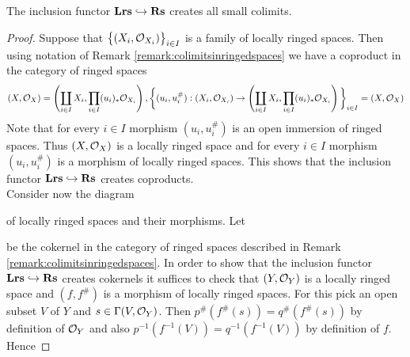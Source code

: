 \begin{theorem}\label{theorem:colimitscreationforLrstoRs}
The inclusion functor $\mathbf{Lrs}\hookrightarrow \mathbf{Rs}$ creates all small colimits.
\end{theorem}
\begin{proof}
Suppose that $\big\{(X_i,{\mathcal O}_{X_i})\big\}_{i\in I}$ is a family of locally ringed spaces. Then using notation of Remark \ref{remark:colimitsinringedspaces} we have a coproduct in the category of ringed spaces
$$(X,{\mathcal O}_X) = \left(\coprod_{i\in I}X_i,\prod_{i\in I}(u_i)_*{\mathcal O}_{X_i}\right),\bigg\{(u_i,u_i^{\#}):(X_i,{\mathcal O}_{X_i})\rightarrow \left(\coprod_{i\in I}X_i,\prod_{i\in I}(u_i)_*{\mathcal O}_{X_i}\right)\bigg\}_{i\in I} = (X,{\mathcal O}_X)$$
Note that for every $i\in I$ morphism $(u_i,u_i^{\#})$ is an open immersion of ringed spaces. Thus $(X,{\mathcal O}_X)$ is a locally ringed space and for every $i\in I$ morphism $(u_i,u_i^{\#})$ is a morphism of locally ringed spaces. This shows that the inclusion functor $\mathbf{Lrs}\hookrightarrow \mathbf{Rs}$ creates coproducts.\\
Consider now the diagram
\begin{center}
\end{center}
of locally ringed spaces and their morphisms. Let
\begin{center}
\end{center}
be the cokernel in the category of ringed spaces described in Remark \ref{remark:colimitsinringedspaces}. In order to show that the inclusion functor $\mathbf{Lrs}\hookrightarrow \mathbf{Rs}$ creates cokernels it suffices to check that $(Y,{\mathcal O}_Y)$ is a locally ringed space and $(f,f^{\#})$ is a morphism of locally ringed spaces. For this pick an open subset $V$ of $Y$ and $s\in \Gamma(V,{\mathcal O}_Y)$. Then $p^{\#}(f^{\#}(s)) = q^{\#}(f^{\#}(s))$ by definition of ${\mathcal O}_Y$ and also $p^{-1}(f^{-1}(V)) = q^{-1}(f^{-1}(V))$ by definition of $f$. Hence

\end{proof}
